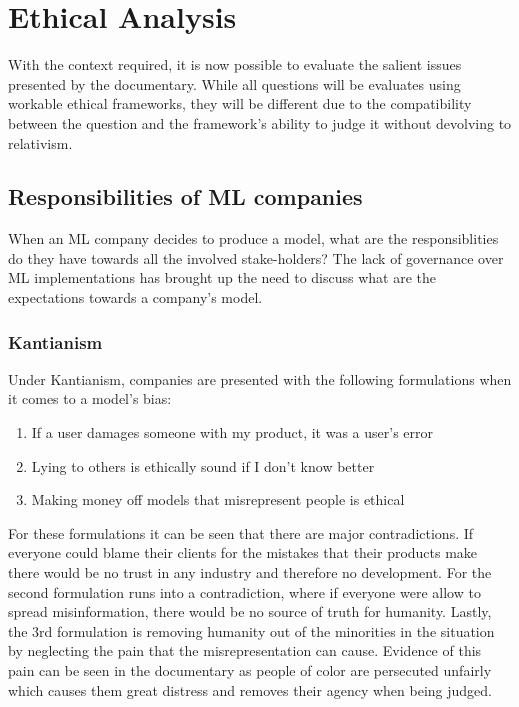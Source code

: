 \section{Ethical Analysis}
With the context required, it is now possible to evaluate the salient issues presented by the documentary. While all questions will be evaluates using workable ethical frameworks, they will be different due to the compatibility between the question and the framework's ability to judge it without devolving to relativism.

\subsection{Responsibilities of ML companies}
When an ML company decides to produce a model, what are the responsiblities do they have towards all the involved stake-holders? The lack of governance over ML implementations has brought up the need to discuss what are the expectations towards a company's model.

\subsubsection{Kantianism}
Under Kantianism, companies are presented with the following formulations when it comes to a model's bias:

\begin{enumerate}
	\item{If a user damages someone with my product, it was a user's error}
	\item{Lying to others is ethically sound if I don't know better}
	\item{Making money off models that misrepresent people is ethical}
\end{enumerate}

For these formulations it can be seen that there are major contradictions. If everyone could blame their clients for the mistakes that their products make there would be no trust in any industry and therefore no development. For the second formulation runs into a contradiction, where if everyone were allow to spread misinformation, there would be no source of truth for humanity. Lastly, the 3rd formulation is removing humanity out of the minorities in the situation by neglecting the pain that the misrepresentation can cause. Evidence of this pain can be seen in the documentary as people of color are persecuted unfairly which causes them great distress and removes their agency when being judged. \cite{GenderShades} \cite{BigBrotherWatch}

